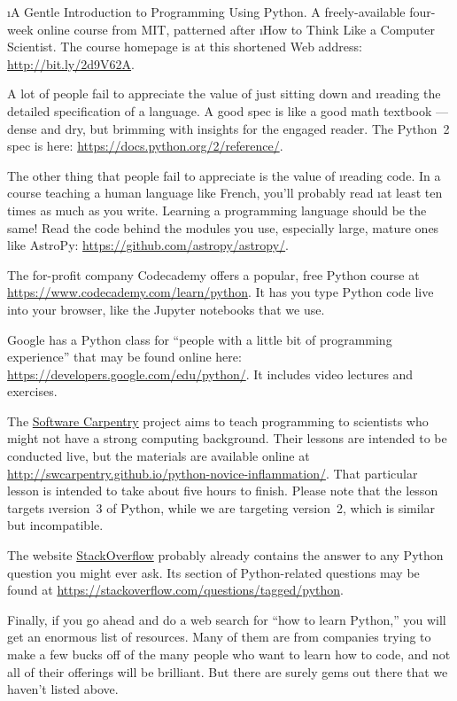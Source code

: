 \documentclass[letterpaper, 12pt, titlepage, twoside]{article}
\begin{document}
\i{A Gentle Introduction to Programming Using Python}. A freely-available
four-week online course from MIT, patterned after \i{How to Think Like a
  Computer Scientist}. The course homepage is at this shortened Web address:
\url{http://bit.ly/2d9V62A}.

A lot of people fail to appreciate the value of just sitting down and
\i{reading the detailed specification} of a language. A good spec is like a
good math textbook --- dense and dry, but brimming with insights for the
engaged reader. The Python~2 spec is here:
\url{https://docs.python.org/2/reference/}.

The other thing that people fail to appreciate is the value of \i{reading
  code}. In a course teaching a human language like French, you'll probably
read \i{at least} ten times as much as you write. Learning a programming
language should be the same! Read the code behind the modules you use,
especially large, mature ones like AstroPy:
\url{https://github.com/astropy/astropy/}.

The for-profit company Codecademy offers a popular, free Python course at
\url{https://www.codecademy.com/learn/python}. It has you type Python code
live into your browser, like the Jupyter notebooks that we use.

Google has a Python class for ``people with a little bit of programming
experience'' that may be found online here:
\url{https://developers.google.com/edu/python/}. It includes video lectures
and exercises.

The \href{https://software-carpentry.org/}{Software Carpentry} project aims to
teach programming to scientists who might not have a strong computing
background. Their lessons are intended to be conducted live, but the materials
are available online at
\url{http://swcarpentry.github.io/python-novice-inflammation/}. That
particular lesson is intended to take about five hours to finish. Please note
that the lesson targets \i{version~3} of Python, while we are targeting
version~2, which is similar but incompatible.

The website \href{https://stackoverflow.com/}{StackOverflow} probably already
contains the answer to any Python question you might ever ask. Its section of
Python-related questions may be found at
\url{https://stackoverflow.com/questions/tagged/python}.

Finally, if you go ahead and do a web search for ``how to learn Python,'' you
will get an enormous list of resources. Many of them are from companies trying
to make a few bucks off of the many people who want to learn how to code, and
not all of their offerings will be brilliant. But there are surely gems out
there that we haven't listed above.
\end{document}
